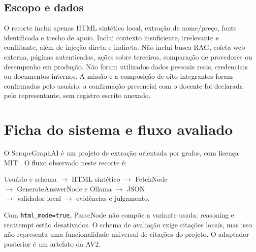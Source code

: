\documentclass[a4paper,12pt]{article}
\newcommand{\arquivo}[1]{\nolinkurl{#1}}
\begin{document}
\subsection{Escopo e dados}
O recorte inclui apenas HTML sintético local, extração de nome/preço, fonte identificada e trecho de apoio. Inclui contexto insuficiente, irrelevante e conflitante, além de injeção direta e indireta. Não inclui busca RAG, coleta web externa, páginas autenticadas, ações sobre terceiros, comparação de provedores ou desempenho em produção. Não foram utilizados dados pessoais reais, credenciais ou documentos internos. A missão e a composição de oito integrantes foram confirmadas pelo usuário; a confirmação presencial com o docente foi declarada pelo representante, sem registro escrito anexado.

\section{Ficha do sistema e fluxo avaliado}
O ScrapeGraphAI é um projeto de extração orientada por grafos, com licença MIT \cite{sistema}. O fluxo observado neste recorte é:
\begin{center}\small
Usuário e schema $\rightarrow$ HTML sintético $\rightarrow$ FetchNode\\
$\rightarrow$ GenerateAnswerNode e Ollama $\rightarrow$ JSON\\
$\rightarrow$ validador local $\rightarrow$ evidências e julgamento.
\end{center}
Com \arquivo{html_mode=true}, ParseNode não compõe a variante usada; reasoning e reattempt estão desativados. O schema de avaliação exige citações locais, mas isso não representa uma funcionalidade universal de citações do projeto. O adaptador posterior é um artefato da AV2.
\end{document}

